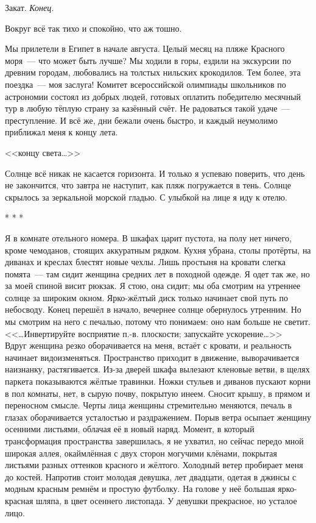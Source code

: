 \documentclass[openany, oneside]{book}
\begin{document}
Закат. \textit{Конец.}

Вокруг всё так тихо и спокойно, что аж тошно.

Мы прилетели в Египет в начале августа. Целый месяц на пляже Красного моря~--- что может быть лучше? Мы ходили в горы, ездили на экскурсии по древним городам, любовались на толстых нильских крокодилов. Тем более, эта поездка~--- моя заслуга! Комитет всероссийской олимпиады школьников по астрономии состоял из добрых людей, готовых оплатить победителю месячный тур в любую тёплую страну за казённый счёт. Не радоваться такой удаче~--- преступление. И всё же, дни бежали очень быстро, и каждый неумолимо приближал меня к концу лета.

<< концу света\dots>>

Солнце всё никак не касается горизонта. И только я успеваю поверить, что день не закончится, что завтра не наступит, как пляж погружается в тень. Солнце скрылось за зеркальной морской гладью. С улыбкой на лице я иду к отелю.

\begin{center}
    * * * 
\end{center}

Я в комнате отельного номера. В шкафах царит пустота, на полу нет ничего, кроме чемоданов, стоящих аккуратным рядком. Кухня убрана, столы протёрты, на диванах и креслах блестят новые чехлы. Лишь простыня на кровати слегка помята~--- там сидит женщина средних лет в походной одежде. Я одет так же, но за моей спиной висит рюкзак. Я стою, она сидит; мы оба смотрим на утреннее солнце за широким окном. Ярко-жёлтый диск только начинает свой путь по небосводу. Конец перешёл в начало, вечернее солнце обернулось утренним. Но мы смотрим на него с печалью, потому что понимаем: оно нам больше не светит.\\

<<\dots Инвертируйте восприятие п.-в. плоскости; запускайте ускорение\dots>>\\

Вдруг женщина резко оборачивается на меня, встаёт с кровати, и реальность начинает видоизменяться. Пространство приходит в движение, выворачивается наизнанку, растягивается. Из-за дверей шкафа вылезают кленовые ветви, в щелях паркета показываются жёлтые травинки. Ножки стульев и диванов пускают корни в пол комнаты, нет, в сырую почву, покрытую инеем. Сносит крышу, в прямом и переносном смысле. Черты лица женщины стремительно меняются, печаль в глазах оборачивается усталостью и раздражением. Порыв ветра осыпает женщину осенними листьями, облачая её в новый наряд. Момент, в который трансформация пространства завершилась, я не ухватил, но сейчас передо мной широкая аллея, окаймлённая с двух сторон могучими клёнами, покрытая листьями разных оттенков красного и жёлтого. Холодный ветер пробирает меня до костей. Напротив стоит молодая девушка, лет двадцати, одетая в джинсы с модным красным ремнём и простую футболку. На голове у неё большая ярко-красная шляпа, в цвет осеннего листопада. У девушки прекрасное, но усталое лицо.
\end{document}
